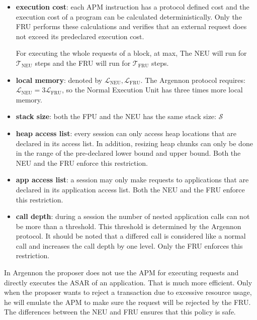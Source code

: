 \begin{itemize}
    \item \textbf{execution cost}:
    each APM instruction has a protocol defined cost and the execution cost of a program can be calculated
    deterministically. Only the FRU performs these calculations and verifies that an external request does not exceed
    its predeclared execution cost.

    For executing the whole requests of a block, at max, The NEU will run for
    $\mathcal{T}_{\text{NEU}}$ steps and the FRU will run for
    $\mathcal{T}_{\text{FRU}}$ steps.

    \item \textbf{local memory}: denoted by $\mathcal{L}_{\text{NEU}}, \mathcal{L}_{\text{FRU}}$. The Argennon protocol
    requires: $\mathcal{L}_{\text{NEU}} = 3\mathcal{L}_{\text{FRU}}$, so the Normal Execution Unit has three
    times more local memory.

    \item \textbf{stack size}: both the FPU and the NEU has the same stack size: $\mathcal{S}$

    \item \textbf{heap access list}:
    every session can only access heap locations that are declared in its access list. In addition,
    resizing heap chunks can only be done in the range of the pre-declared lower bound and upper bound. Both the NEU
    and the FRU enforce this restriction.
    \item \textbf{app access list}:
    a session may only make requests to applications that are declared in its application access list. Both the NEU
    and the FRU enforce this restriction.
    \item \textbf{call depth}:
    during a session the number of nested application calls can not be more than a threshold. This threshold is
    determined by the Argennon protocol. It should be noted that a differed call is considered like a normal call and
    increases the call depth by one level. Only the FRU enforces this restriction.
\end{itemize}

In Argennon the proposer does not use the APM for executing requests and directly executes the ASAR of an
application. That is much more efficient. Only when the proposer wants to reject a transaction due to excessive
resource usage, he will emulate the APM to make sure the request will be rejected by the FRU. The differences
between the NEU and FRU ensures that this policy is safe.